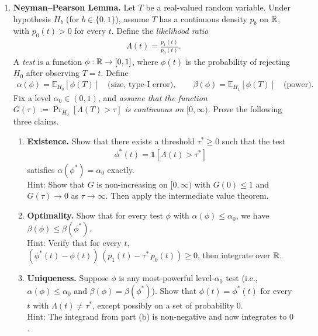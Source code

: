 \documentclass[12pt]{article}
\newcommand{\fE}{\mathbb{E}}
\begin{document}
\begin{enumerate}

\item \textbf{Neyman--Pearson Lemma.}
Let $T$ be a real-valued random variable. Under hypothesis $H_b$ (for $b \in \{0, 1\}$), assume $T$ has a continuous density $p_b$ on ${\mathbb{R}}$, with $p_0(t) > 0$ for every $t$. Define the \emph{likelihood ratio}
\begin{align*}
    \Lambda(t) = \frac{p_1(t)}{p_0(t)}.
\end{align*}
A \emph{test} is a function $\phi : {\mathbb{R}} \to [0, 1]$, where $\phi(t)$ is the probability of rejecting $H_0$ after observing $T = t$. Define
\begin{align*}
    \alpha(\phi) = \fE_{H_0}[\phi(T)] \quad \text{(size, type-I error)}, \qquad \beta(\phi) = \fE_{H_1}[\phi(T)] \quad \text{(power)}.
\end{align*}
Fix a level $\alpha_0 \in (0, 1)$, and \emph{assume that the function $G(\tau) := \Pr_{H_0}[\Lambda(T) > \tau]$ is continuous on $[0, \infty)$}. Prove the following three claims.
\begin{enumerate}
    \item \textbf{Existence.} Show that there exists a threshold $\tau^* \ge 0$ such that the test
    \begin{align*}
        \phi^*(t) = \mathbf{1}[\Lambda(t) > \tau^*]
    \end{align*}
    satisfies $\alpha(\phi^*) = \alpha_0$ exactly.\\
    Hint: Show that $G$ is non-increasing on $[0, \infty)$ with $G(0) \le 1$ and $G(\tau) \to 0$ as $\tau \to \infty$. Then apply the intermediate value theorem.

    \item \textbf{Optimality.} Show that for every test $\phi$ with $\alpha(\phi) \le \alpha_0$, we have $\beta(\phi) \le \beta(\phi^*)$.\\
    Hint: Verify that for every $t$, $(\phi^*(t) - \phi(t))\,(p_1(t) - \tau^*\, p_0(t)) \ge 0$, then integrate over ${\mathbb{R}}$.

    \item \textbf{Uniqueness.} Suppose $\phi$ is any most-powerful level-$\alpha_0$ test (i.e., $\alpha(\phi) \le \alpha_0$ and $\beta(\phi) = \beta(\phi^*)$). Show that $\phi(t) = \phi^*(t)$ for every $t$ with $\Lambda(t) \ne \tau^*$, except possibly on a set of probability $0$.\\
    Hint: The integrand from part (b) is non-negative and now integrates to $0$.
\end{enumerate}


\end{enumerate}
\end{document}
